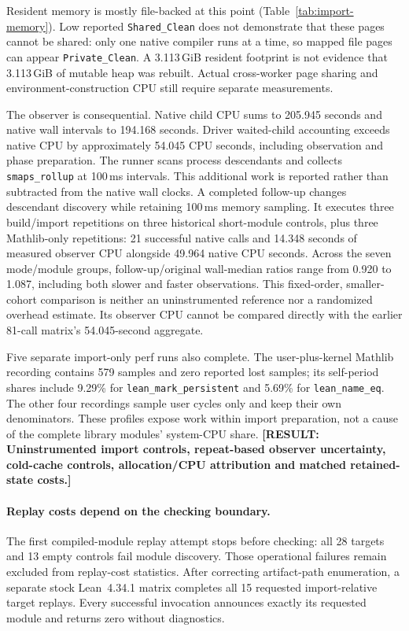 \documentclass[10pt,twocolumn]{article}
\newcommand{\missing}[1]{\textbf{[RESULT: #1]}}
\begin{document}
Resident memory is mostly file-backed at this point
(Table~\ref{tab:import-memory}). Low reported \texttt{Shared\_Clean}
does not demonstrate that these pages cannot be shared: only one native
compiler runs at a time, so mapped file pages can appear
\texttt{Private\_Clean}. A 3.113\,GiB resident footprint is not evidence
that 3.113\,GiB of mutable heap was rebuilt.
Actual cross-worker page sharing and environment-construction CPU
still require separate measurements.

The observer is consequential. Native child CPU sums to 205.945 seconds
and native wall intervals to 194.168 seconds.
Driver waited-child accounting exceeds native CPU by approximately
54.045 CPU seconds, including observation and phase preparation.
The runner scans process descendants and collects \texttt{smaps\_rollup}
at 100\,ms intervals. This additional work is reported rather than
subtracted from the native wall clocks.
A completed follow-up changes descendant discovery while retaining
100\,ms memory sampling. It executes three build/import repetitions on
three historical short-module controls, plus three Mathlib-only repetitions:
21 successful native calls and 14.348 seconds of measured observer CPU
alongside 49.964 native CPU seconds.
Across the seven mode/module groups, follow-up/original wall-median ratios
range from 0.920 to 1.087, including both slower and faster observations.
This fixed-order, smaller-cohort comparison is neither an uninstrumented
reference nor a randomized overhead estimate. Its observer CPU cannot be
compared directly with the earlier 81-call matrix's 54.045-second aggregate.

Five separate import-only perf runs also complete.
The user-plus-kernel Mathlib recording contains 579 samples and zero
reported lost samples; its self-period shares include 9.29\% for
\texttt{lean\_mark\_persistent} and 5.69\% for \texttt{lean\_name\_eq}.
The other four recordings sample user cycles only and keep their own
denominators. These profiles expose work within import preparation,
not a cause of the complete library modules' system-CPU share.
\missing{Uninstrumented import controls, repeat-based observer uncertainty,
cold-cache controls, allocation/CPU attribution and matched retained-state costs.}

\paragraph{Replay costs depend on the checking boundary.}
The first compiled-module replay attempt stops before checking:
all 28 targets and 13 empty controls fail module discovery.
Those operational failures remain excluded from replay-cost statistics.
After correcting artifact-path enumeration, a separate stock Lean~4.34.1
matrix completes all 15 requested import-relative target replays.
Every successful invocation announces exactly its requested module and
returns zero without diagnostics.
\end{document}
